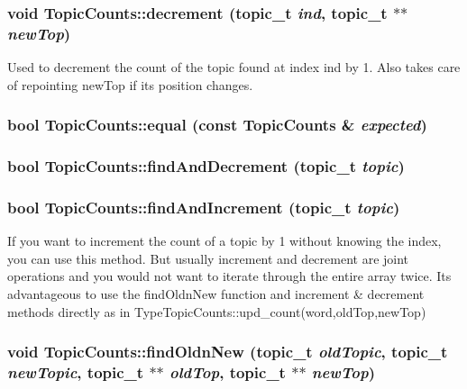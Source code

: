 \label{struct_topic_counts_a966dfd85c2c14918bed470515e88aa3b}
\hypertarget{struct_topic_counts_a0c6d1cf4216657d55566b56923c71122}{
\subsubsection[{decrement}]{\setlength{\rightskip}{0pt plus 5cm}void TopicCounts::decrement (topic\_\-t {\em ind}, \/  topic\_\-t $\ast$$\ast$ {\em newTop})}}
\label{struct_topic_counts_a0c6d1cf4216657d55566b56923c71122}
Used to decrement the count of the topic found at index ind by 1. Also takes care of repointing newTop if its position changes. \hypertarget{struct_topic_counts_a6ce31e2d544126f259f5f07117552284}{
\subsubsection[{equal}]{\setlength{\rightskip}{0pt plus 5cm}bool TopicCounts::equal (const {\bf TopicCounts} \& {\em expected})}}
\label{struct_topic_counts_a6ce31e2d544126f259f5f07117552284}
\hypertarget{struct_topic_counts_afd277219286187aaddd4acebc8a944bc}{
\subsubsection[{findAndDecrement}]{\setlength{\rightskip}{0pt plus 5cm}bool TopicCounts::findAndDecrement (topic\_\-t {\em topic})}}
\label{struct_topic_counts_afd277219286187aaddd4acebc8a944bc}
\hypertarget{struct_topic_counts_ad4751b60bf3af5a7c532ca547878a3ea}{
\subsubsection[{findAndIncrement}]{\setlength{\rightskip}{0pt plus 5cm}bool TopicCounts::findAndIncrement (topic\_\-t {\em topic})}}
\label{struct_topic_counts_ad4751b60bf3af5a7c532ca547878a3ea}
If you want to increment the count of a topic by 1 without knowing the index, you can use this method. But usually increment and decrement are joint operations and you would not want to iterate through the entire array twice. Its advantageous to use the findOldnNew function and increment \& decrement methods directly as in TypeTopicCounts::upd\_\-count(word,oldTop,newTop) \hypertarget{struct_topic_counts_ae4bd9fecceabe2e87ebd54b81442055f}{
\subsubsection[{findOldnNew}]{\setlength{\rightskip}{0pt plus 5cm}void TopicCounts::findOldnNew (topic\_\-t {\em oldTopic}, \/  topic\_\-t {\em newTopic}, \/  topic\_\-t $\ast$$\ast$ {\em oldTop}, \/  topic\_\-t $\ast$$\ast$ {\em newTop})}}
